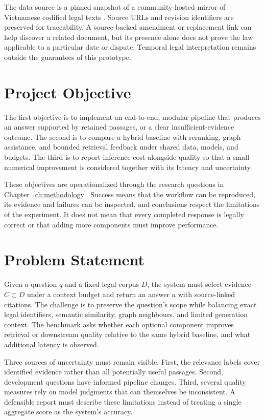 The data source is a pinned snapshot of a community-hosted mirror of Vietnamese codified legal texts \citep{phapdien}. Source URLs and revision identifiers are preserved for traceability. A source-backed amendment or replacement link can help discover a related document, but its presence alone does not prove the law applicable to a particular date or dispute. Temporal legal interpretation remains outside the guarantees of this prototype.

\section{Project Objective}
The first objective is to implement an end-to-end, modular pipeline that produces an answer supported by retained passages, or a clear insufficient-evidence outcome. The second is to compare a hybrid baseline with reranking, graph assistance, and bounded retrieval feedback under shared data, models, and budgets. The third is to report inference cost alongside quality so that a small numerical improvement is considered together with its latency and uncertainty.

These objectives are operationalized through the research questions in Chapter~\ref{ch:methodology}. Success means that the workflow can be reproduced, its evidence and failures can be inspected, and conclusions respect the limitations of the experiment. It does not mean that every completed response is legally correct or that adding more components must improve performance.

\section{Problem Statement}
Given a question $q$ and a fixed legal corpus $D$, the system must select evidence $C\subset D$ under a context budget and return an answer $a$ with source-linked citations. The challenge is to preserve the question's scope while balancing exact legal identifiers, semantic similarity, graph neighbours, and limited generation context. The benchmark asks whether each optional component improves retrieval or downstream quality relative to the same hybrid baseline, and what additional latency is observed.

Three sources of uncertainty must remain visible. First, the relevance labels cover identified evidence rather than all potentially useful passages. Second, development questions have informed pipeline changes. Third, several quality measures rely on model judgments that can themselves be inconsistent. A defensible report must describe these limitations instead of treating a single aggregate score as the system's accuracy.

